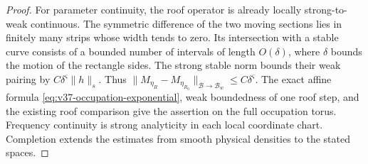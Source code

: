 \begin{proof}
For parameter continuity, the roof operator is already locally
strong-to-weak continuous. The symmetric difference of the two moving
sections lies in finitely many strips whose width tends to zero.
Its intersection with a stable curve consists of a bounded number of
intervals of length $O(\delta)$, where $\delta$ bounds the motion of
the rectangle sides. The strong stable norm bounds their weak pairing
by $C\delta^\varsigma\|h\|_s$. Thus
$\|M_{\eta_R}-M_{\eta_{R_0}}\|_{\mathcal B\to\mathcal B_w}
\le C\delta^\varsigma$. The exact affine formula
\eqref{eq:v37-occupation-exponential}, weak boundedness of one roof
step, and the existing roof comparison give the assertion on the full
occupation torus. Frequency continuity is strong analyticity in each
local coordinate chart. Completion extends the estimates from smooth
physical densities to the stated spaces.
\end{proof}

